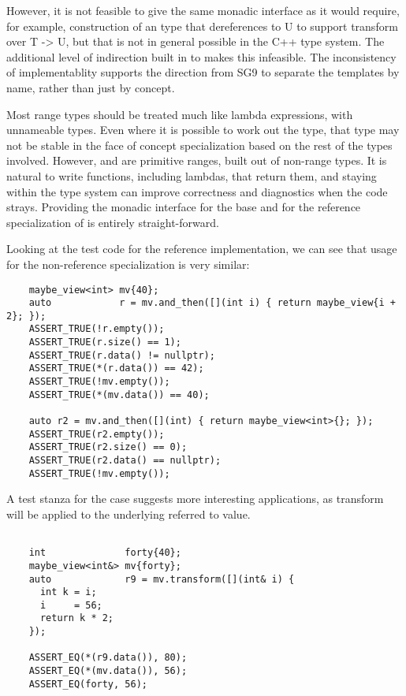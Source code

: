 \documentclass[a4paper,10pt,oneside,openany,final,article]{memoir}
\begin{document}
However, it is not feasible to give  the same monadic interface as it would require, for example,  construction of an type that dereferences to U to support transform over T -> U, but that is not in general possible in the C++ type system. The additional level of indirection built in to  makes this infeasible. The inconsistency of implementablity supports the direction from SG9 to separate the templates by name, rather than just by concept.

Most range types should be treated much like lambda expressions, with unnameable types. Even where it is possible to work out the type, that type may not be stable in the face of concept specialization based on the rest of the types involved. However,  and  are primitive ranges, built out of non-range types. It is natural to write functions, including lambdas, that return them, and staying within the type system can improve correctness and diagnostics when the code strays. Providing the monadic interface for the base and for the reference specialization of  is entirely straight-forward.

Looking at the test code for the reference implementation, we can see that usage for the non-reference specialization is very similar:

\begin{minipage}[t]{\linewidth}
  \begin{verbatim}
    maybe_view<int> mv{40};
    auto            r = mv.and_then([](int i) { return maybe_view{i + 2}; });
    ASSERT_TRUE(!r.empty());
    ASSERT_TRUE(r.size() == 1);
    ASSERT_TRUE(r.data() != nullptr);
    ASSERT_TRUE(*(r.data()) == 42);
    ASSERT_TRUE(!mv.empty());
    ASSERT_TRUE(*(mv.data()) == 40);

    auto r2 = mv.and_then([](int) { return maybe_view<int>{}; });
    ASSERT_TRUE(r2.empty());
    ASSERT_TRUE(r2.size() == 0);
    ASSERT_TRUE(r2.data() == nullptr);
    ASSERT_TRUE(!mv.empty());

  \end{verbatim}
\end{minipage}

A test stanza for the  case suggests more interesting applications, as transform will be applied to the underlying referred to value.

\begin{minipage}[t]{\linewidth}
  \begin{verbatim}

    int              forty{40};
    maybe_view<int&> mv{forty};
    auto             r9 = mv.transform([](int& i) {
      int k = i;
      i     = 56;
      return k * 2;
    });

    ASSERT_EQ(*(r9.data()), 80);
    ASSERT_EQ(*(mv.data()), 56);
    ASSERT_EQ(forty, 56);

  \end{verbatim}
\end{minipage}
\end{document}

